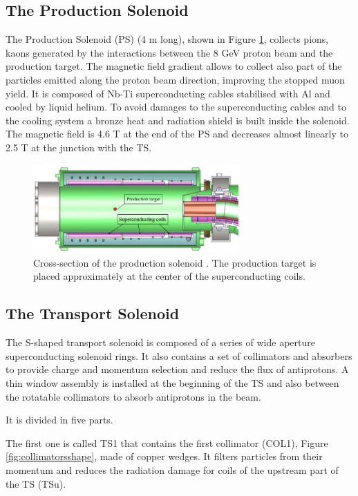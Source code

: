 \subsection{The Production Solenoid}
The Production Solenoid (PS) (4 m long), shown in Figure \ref{fig:PS}, collects pions, 
kaons generated by the interactions between the 8 GeV proton beam and the production target. 
The magnetic field gradient allows to collect also part of the particles 
emitted along the proton beam direction, improving the stopped muon yield.
It is composed of Nb-Ti superconducting cables stabilised with Al 
and cooled by liquid helium. To avoid damages to the superconducting cables and
to the cooling system a bronze heat and radiation shield is built inside the solenoid.
The magnetic field is 4.6 T at the end of the PS and decreases almost linearly to 2.5 T at the
junction with the TS.
\begin{figure}[!h]
    \centering
    \includegraphics[width =0.7\textwidth]{figures/png/800px-Production_solenoid.png}
    \caption[The cross-section of the production solenoid.]{Cross-section of the production solenoid \cite{6376120}.
    The production target is placed approximately at the center of the superconducting coils.}
    \label{fig:PS}
    \end{figure}
\subsection{The Transport Solenoid}
The S-shaped transport solenoid is composed of a series of wide aperture superconducting
solenoid rings. It also contains a set of collimators and absorbers to provide charge and 
momentum selection and reduce the flux of antiprotons.
A thin window assembly is installed at the 
beginning of the TS and also between the rotatable collimators to absorb antiprotons in 
the beam. 

It is divided in five parts. 

The first one is called TS1 that contains the first collimator (COL1), 
Figure \ref{fig:collimatorsshape}, made of copper wedges. 
It filters particles from their momentum and reduces the radiation damage for coils of the 
upstream part of the TS (TSu). 


